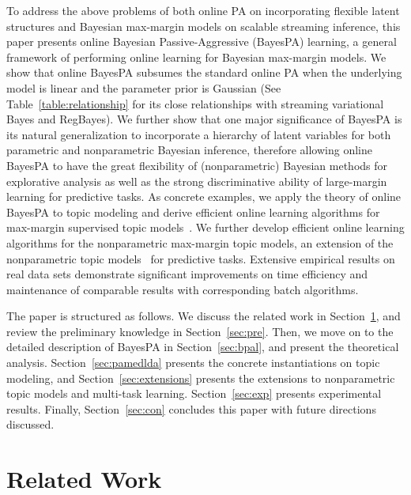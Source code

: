 \documentclass[twoside,11pt]{article}
\begin{document}
To address the above problems of both online PA on incorporating flexible latent structures and Bayesian max-margin models on scalable streaming inference, this paper presents online Bayesian Passive-Aggressive (BayesPA) learning, a general framework of performing online learning for Bayesian max-margin models. %
We show that online BayesPA subsumes the standard online PA when the underlying model is linear and the parameter prior is Gaussian (See Table~\ref{table:relationship} for its close relationships with streaming variational Bayes and RegBayes). We further show that one major significance of BayesPA is its natural generalization to incorporate a hierarchy of latent variables for both parametric and nonparametric Bayesian inference, therefore allowing online BayesPA to have the great flexibility of (nonparametric) Bayesian methods for explorative analysis as well as the strong discriminative ability of large-margin learning for predictive tasks. As concrete examples, we apply the theory of online BayesPA to topic modeling and derive efficient online learning algorithms for max-margin supervised topic models~\citep{zhu2012medlda}. We further develop efficient online learning algorithms for the nonparametric max-margin topic models, an extension of the nonparametric topic models~\citep{teh2006hierarchical} for predictive tasks. Extensive empirical results on real data sets demonstrate significant improvements on time efficiency and maintenance of comparable results with corresponding batch algorithms.

The paper is structured as follows. We discuss the related work in Section~\ref{sec:relatedwork}, and review the preliminary knowledge in Section~\ref{sec:pre}. Then, we move on to the detailed description of BayesPA in Section~\ref{sec:bpal}, and present the theoretical analysis. Section~\ref{sec:pamedlda} presents the concrete instantiations on topic modeling, and Section~\ref{sec:extensions} presents the extensions to nonparametric topic models and multi-task learning. Section~\ref{sec:exp} presents experimental results. Finally, Section~\ref{sec:con} concludes this paper with future directions discussed.

\section{Related Work}\label{sec:relatedwork}
\end{document}
